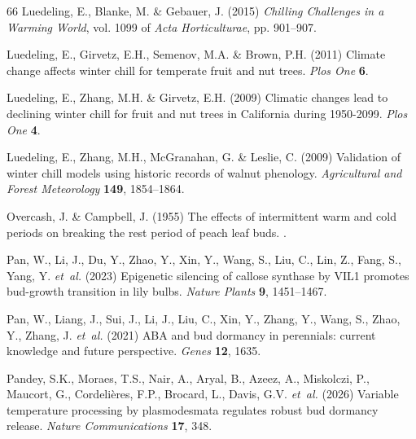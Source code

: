 \documentclass[11pt]{article}
\begin{document}
\begin{thebibliography}{66}
Luedeling, E., Blanke, M. \& Gebauer, J. (2015) \emph{Chilling Challenges in a
  Warming World}, vol. 1099 of \emph{Acta Horticulturae}, pp. 901--907.

Luedeling, E., Girvetz, E.H., Semenov, M.A. \& Brown, P.H. (2011) Climate
  change affects winter chill for temperate fruit and nut trees. \emph{Plos
  One} \textbf{6}.

Luedeling, E., Zhang, M.H. \& Girvetz, E.H. (2009{}) {Climatic
  changes lead to declining winter chill for fruit and nut trees in California
  during 1950-2099}. \emph{Plos One} \textbf{4}.

Luedeling, E., Zhang, M.H., McGranahan, G. \& Leslie, C. (2009{})
  Validation of winter chill models using historic records of walnut phenology.
  \emph{Agricultural and Forest Meteorology} \textbf{149}, 1854--1864.

Overcash, J. \& Campbell, J. (1955) The effects of intermittent warm and cold
  periods on breaking the rest period of peach leaf buds. .

Pan, W., Li, J., Du, Y., Zhao, Y., Xin, Y., Wang, S., Liu, C., Lin, Z., Fang,
  S., Yang, Y. \emph{et~al.} (2023) {Epigenetic silencing of callose synthase
  by VIL1 promotes bud-growth transition in lily bulbs}. \emph{Nature Plants}
  \textbf{9}, 1451--1467.

Pan, W., Liang, J., Sui, J., Li, J., Liu, C., Xin, Y., Zhang, Y., Wang, S.,
  Zhao, Y., Zhang, J. \emph{et~al.} (2021) {ABA and bud dormancy in perennials:
  current knowledge and future perspective}. \emph{Genes} \textbf{12}, 1635.

Pandey, S.K., Moraes, T.S., Nair, A., Aryal, B., Azeez, A., Miskolczi, P.,
  Maucort, G., Cordeli{\`e}res, F.P., Brocard, L., Davis, G.V. \emph{et~al.}
  (2026) Variable temperature processing by plasmodesmata regulates robust bud
  dormancy release. \emph{Nature Communications} \textbf{17}, 348.


\end{thebibliography}
\end{document}
